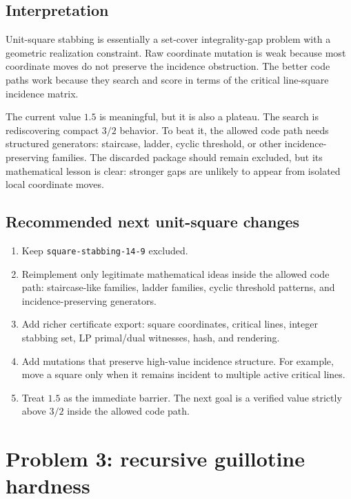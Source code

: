 \documentclass[11pt]{article}
\newcommand{\code}[1]{\texttt{#1}}
\begin{document}
\subsection{Interpretation}

Unit-square stabbing is essentially a set-cover integrality-gap problem with a
geometric realization constraint.  Raw coordinate mutation is weak because most
coordinate moves do not preserve the incidence obstruction.  The better code
paths work because they search and score in terms of the critical
line-square incidence matrix.

The current value $1.5$ is meaningful, but it is also a plateau.  The search is
rediscovering compact $3/2$ behavior.  To beat it, the allowed code path needs
structured generators: staircase, ladder, cyclic threshold, or other
incidence-preserving families.  The discarded package should remain excluded,
but its mathematical lesson is clear: stronger gaps are unlikely to appear
from isolated local coordinate moves.

\subsection{Recommended next unit-square changes}

\begin{enumerate}
\item Keep \code{square-stabbing-14-9} excluded.
\item Reimplement only legitimate mathematical ideas inside the allowed code
path: staircase-like families, ladder families, cyclic threshold patterns, and
incidence-preserving generators.
\item Add richer certificate export: square coordinates, critical lines,
integer stabbing set, LP primal/dual witnesses, hash, and rendering.
\item Add mutations that preserve high-value incidence structure.  For example,
move a square only when it remains incident to multiple active critical lines.
\item Treat $1.5$ as the immediate barrier.  The next goal is a verified value
strictly above $3/2$ inside the allowed code path.
\end{enumerate}

\clearpage
\section{Problem 3: recursive guillotine hardness}
\end{document}
